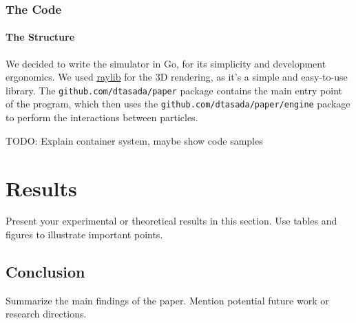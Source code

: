 \documentclass[a4paper,12pt]{report}
\begin{document}
\subsection{The Code}
\subsubsection{The Structure}
We decided to write the simulator in Go, for its simplicity and development ergonomics.
We used \href{www.github.com/gen2brain/raylib-go/}{raylib} for the 3D rendering, as it's a simple and easy-to-use library.
The \verb|github.com/dtasada/paper| package contains the main entry point of the program, which then
uses the \verb|github.com/dtasada/paper/engine| package to perform the interactions between particles.

TODO: Explain container system, maybe show code samples

\chapter{Results}
Present your experimental or theoretical results in this section. Use tables and figures to illustrate important points.

\section{Conclusion}
Summarize the main findings of the paper. Mention potential future work or research directions.

\nocite{*}
\printbibliography
\end{document}
